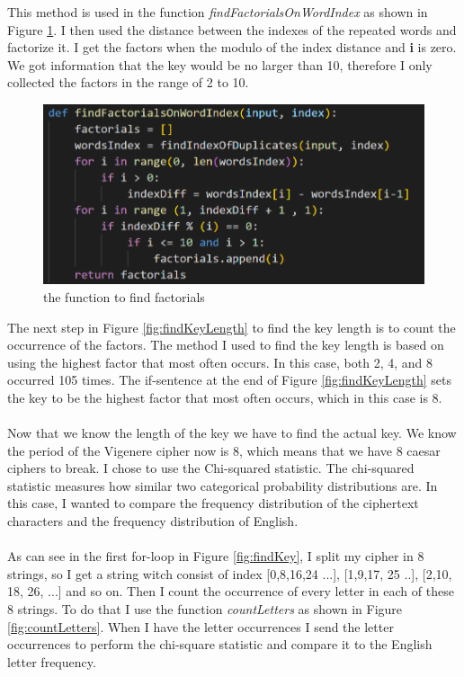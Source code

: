 \documentclass[12pt, letterpaper]{article}
\begin{document}
This method is used in the function \textit{findFactorialsOnWordIndex} as shown in Figure \ref{fig:findFactorialsOnWordIndex}. I then used the distance between the indexes of the repeated words and factorize it. I get the factors when the modulo of the index distance and \textbf{i} is zero. We got information that the key would be no larger than 10, therefore I only collected the factors in the range of 2 to 10.

\begin{figure}[H]
  \includegraphics[width=\linewidth]{code_snippets/findFactorialsOnWordIndex.PNG}
  \caption{the function to find factorials}
  \label{fig:findFactorialsOnWordIndex}
\end{figure}

The next step in Figure \ref{fig:findKeyLength} to find the key length is to count the occurrence of the factors. The method I used to find the key length is based on using the highest factor that most often occurs. In this case, both 2, 4, and 8 occurred 105 times. The if-sentence at the end of Figure \ref{fig:findKeyLength} sets the key to be the highest factor that most often occurs, which in this case is 8.
\\ \\
Now that we know the length of the key we have to find the actual key. We know the period of the Vigenere cipher now is 8, which means that we have 8 caesar ciphers to break. I chose to use the Chi-squared statistic. The chi-squared statistic measures how similar two categorical probability distributions are. In this case, I wanted to compare the frequency distribution of the ciphertext characters and the frequency distribution of English.
\\ \\
As can see in the first for-loop in Figure \ref{fig:findKey}, I split my cipher in 8 strings, so I get a string witch consist of index [0,8,16,24 ...], [1,9,17, 25 ..], [2,10, 18, 26, ...] and so on. Then I count the occurrence of every letter in each of these 8 strings. To do that I use the function \textit{countLetters} as shown in Figure \ref{fig:countLetters}. When I have the letter occurrences I send the letter occurrences to perform the chi-square statistic and compare it to the English letter frequency.
\end{document}
